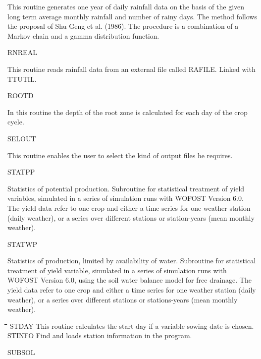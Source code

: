 \begin{indenting}{2.54cm}
This routine generates one year of daily rainfall data on the basis of the
given long term average monthly rainfall and number of rainy days. The
method follows the proposal of Shu Geng et al. (1986). The procedure is a
combination of a Markov chain and a gamma distribution function.
\end{indenting}
RNREAL
\testlastline

\begin{indenting}{2.54cm}
This routine reads rainfall data from an external file called RAFILE.
Linked with TTUTIL.
\end{indenting}
ROOTD
\testlastline

\begin{indenting}{2.54cm}
In this routine the depth of the root zone is calculated for each day of the
crop cycle.
\end{indenting}
SELOUT
\testlastline

\begin{indenting}{2.54cm}
This routine enables the user to select the kind of output files he requires.
\end{indenting}
STATPP
\testlastline

\begin{indenting}{2.54cm}
Statistics of potential production. Subroutine for statistical treatment of
yield variables, simulated in a series of simulation runs with WOFOST
Version 6.0. The yield data refer to one crop and either a time series for
one weather station (daily weather), or a series over different stations or
station-years (mean monthly weather).
\end{indenting}
STATWP
\testlastline

\begin{indenting}{2.54cm}
Statistics of production, limited by availability of water. Subroutine for
statistical treatment of yield variable, simulated in a series of simulation
runs with WOFOST Version 6.0, using the soil water balance model for
free drainage. The yield data refer to one crop and either a time series for
one weather station (daily weather), or a series over different stations or
stations-years (mean monthly weather).
\end{indenting}
\begin{tabbing}
\hspace{1.27cm}\=\hspace{1.27cm}\=\hspace{1.27cm}\=\hspace{1.27cm}\=%
\hspace{1.27cm}\=\hspace{1.27cm}\=\hspace{1.27cm}\=\hspace{1.27cm}\=%
\hspace{1.27cm}\=\hspace{1.27cm}\=\kill
STDAY\> \> This routine calculates the start day if a variable sowing date is chosen.\\
STINFO\> \> Find and loads station information in the program.
\end{tabbing}
SUBSOL
\testlastline


